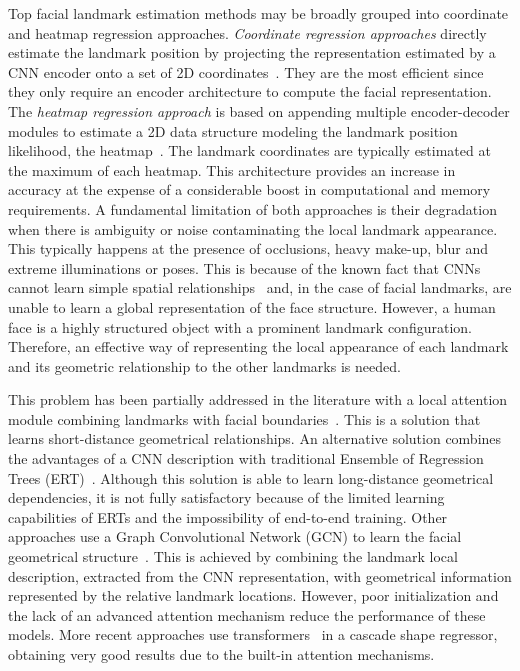\documentclass{bmvc2k}
\begin{document}
Top facial landmark estimation methods may be broadly grouped into coordinate and heatmap regression approaches. \textit{Coordinate regression approaches} directly estimate the landmark position by projecting the representation estimated by a CNN encoder onto a set of 2D coordinates~\cite{Feng18wing,Kowalski17,Feng20rwing,Trigeorgis16,LinTIP21}. They are the most efficient since they only require an encoder architecture to compute the facial representation. 
The \textit{heatmap regression approach} is based on appending multiple encoder-decoder modules to estimate a 2D data structure modeling the landmark position likelihood, the heatmap~\cite{Honari16,Wu18lab,Wang19Awing,Huang20propnet,Kumar20luvli,Huang21ADnet}. The landmark coordinates are typically estimated at the maximum of each heatmap. This architecture provides an increase in accuracy at the expense of a considerable boost in computational and memory requirements. A fundamental limitation of both approaches is their degradation when there is ambiguity or noise contaminating the local landmark appearance. This typically happens at the presence of occlusions, heavy make-up, blur and extreme illuminations or poses. This is because of the known fact that CNNs cannot learn simple spatial relationships~\cite{Santoro17} and, in the case of facial landmarks, are unable to learn a global representation of the face structure. However, a human face is a highly structured object with a prominent landmark configuration. Therefore, an effective way of representing the local appearance of each landmark and its geometric relationship to the other landmarks is needed.

This problem has been partially addressed in the literature with a local attention module combining landmarks with facial boundaries~\cite{Wu18lab,Huang20propnet,Huang21ADnet}. This is a solution that learns short-distance geometrical relationships. An alternative solution combines the advantages of a CNN description with traditional Ensemble of Regression Trees (ERT)~\cite{Valle18,Valle193dde}. Although this solution is able to learn long-distance geometrical dependencies, it is not fully satisfactory because of the limited learning capabilities of ERTs and the impossibility of end-to-end training.
Other approaches use a Graph Convolutional Network (GCN) to learn the facial geometrical structure~\cite{Li20sld,LinTIP21}. This is achieved by combining the landmark local description, extracted from the CNN representation, with geometrical information represented by the relative landmark locations. However, poor initialization and the lack of an advanced attention mechanism reduce the performance of these models.
More recent approaches use transformers~\cite{Li22casctransf, Xia22slpt} in a cascade shape regressor, obtaining very good results due to the built-in attention mechanisms.
\end{document}
